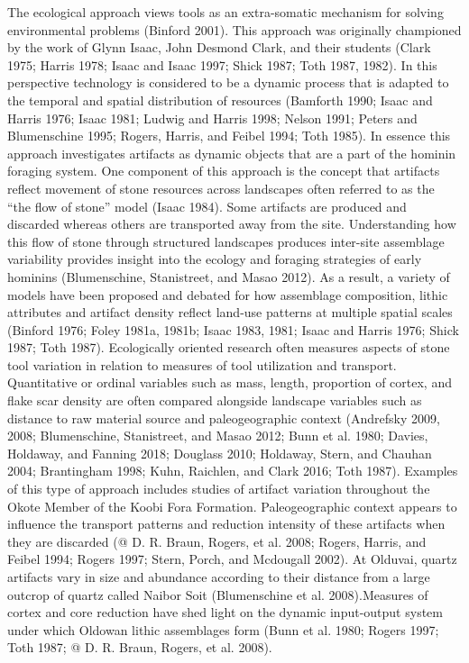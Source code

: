 \documentclass[]{elsarticle} %
\begin{document}
The ecological approach views tools as an extra-somatic mechanism for
solving environmental problems (Binford 2001). This approach was
originally championed by the work of Glynn Isaac, John Desmond Clark,
and their students (Clark 1975; Harris 1978; Isaac and Isaac 1997; Shick
1987; Toth 1987, 1982). In this perspective technology is considered to
be a dynamic process that is adapted to the temporal and spatial
distribution of resources (Bamforth 1990; Isaac and Harris 1976; Isaac
1981; Ludwig and Harris 1998; Nelson 1991; Peters and Blumenschine 1995;
Rogers, Harris, and Feibel 1994; Toth 1985). In essence this approach
investigates artifacts as dynamic objects that are a part of the hominin
foraging system. One component of this approach is the concept that
artifacts reflect movement of stone resources across landscapes often
referred to as the ``the flow of stone'' model (Isaac 1984). Some
artifacts are produced and discarded whereas others are transported away
from the site. Understanding how this flow of stone through structured
landscapes produces inter-site assemblage variability provides insight
into the ecology and foraging strategies of early hominins
(Blumenschine, Stanistreet, and Masao 2012). As a result, a variety of
models have been proposed and debated for how assemblage composition,
lithic attributes and artifact density reflect land-use patterns at
multiple spatial scales (Binford 1976; Foley 1981a, 1981b; Isaac 1983,
1981; Isaac and Harris 1976; Shick 1987; Toth 1987). Ecologically
oriented research often measures aspects of stone tool variation in
relation to measures of tool utilization and transport. Quantitative or
ordinal variables such as mass, length, proportion of cortex, and flake
scar density are often compared alongside landscape variables such as
distance to raw material source and paleogeographic context (Andrefsky
2009, 2008; Blumenschine, Stanistreet, and Masao 2012; Bunn et al. 1980;
Davies, Holdaway, and Fanning 2018; Douglass 2010; Holdaway, Stern, and
Chauhan 2004; Brantingham 1998; Kuhn, Raichlen, and Clark 2016; Toth
1987). Examples of this type of approach includes studies of artifact
variation throughout the Okote Member of the Koobi Fora Formation.
Paleogeographic context appears to influence the transport patterns and
reduction intensity of these artifacts when they are discarded (@ D. R.
Braun, Rogers, et al. 2008; Rogers, Harris, and Feibel 1994; Rogers
1997; Stern, Porch, and Mcdougall 2002). At Olduvai, quartz artifacts
vary in size and abundance according to their distance from a large
outcrop of quartz called Naibor Soit (Blumenschine et al. 2008).Measures
of cortex and core reduction have shed light on the dynamic input-output
system under which Oldowan lithic assemblages form (Bunn et al. 1980;
Rogers 1997; Toth 1987; @ D. R. Braun, Rogers, et al. 2008).
\end{document}
